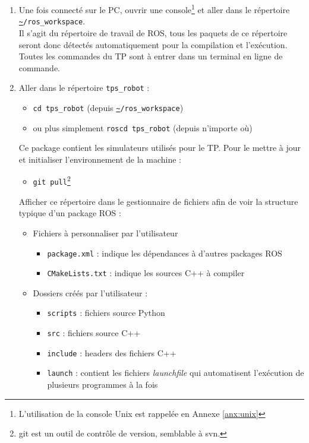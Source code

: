 \documentclass[12pt,a4paper]{article}
\begin{document}
\begin{enumerate}
 \item Une fois connecté sur le PC, ouvrir une console\footnote{ L'utilisation de la console Unix est rappelée en Annexe \ref{anx:unix}} et aller dans le répertoire \texttt{\url{~}/ros\_workspace}.\\
 Il s'agit du répertoire de travail de ROS, tous les paquets de ce répertoire seront donc détectés automatiquement pour la compilation et l'exécution.
Toutes les commandes du TP sont à entrer dans un terminal en ligne de commande.
 \item Aller dans le répertoire \texttt{tps\_robot} : 
 \begin{itemize}
  \item \texttt{cd tps\_robot} (depuis \texttt{\url{~}/ros\_workspace})
  \item ou plus simplement \texttt{roscd tps\_robot} (depuis n'importe où)
 \end{itemize}
 Ce package contient les simulateurs utilisés pour le TP. Pour le mettre à jour et initialiser l'environnement de la machine :
 \begin{itemize}
 \item \texttt{git pull}\footnote{git est un outil de contrôle de version, semblable à svn.}
 \end{itemize}
 Afficher ce répertoire dans le gestionnaire de fichiers afin de voir la structure typique d'un package ROS :
 \begin{itemize}
 \item Fichiers à personnaliser par l'utilisateur
 \begin{itemize}
 \item \texttt{package.xml} : indique les dépendances à d'autres packages ROS
 \item \texttt{CMakeLists.txt} : indique les sources C++ à compiler
 \end{itemize} 
 \item Dossiers créés par l'utilisateur :
 \begin{itemize}
 \item \texttt{scripts} : fichiers source Python
 \item \texttt{src} : fichiers source C++
 \item \texttt{include} : headers des fichiers C++
 \item \texttt{launch} : contient les fichiers \emph{launchfile} qui automatisent l'exécution de plusieurs programmes à la fois

\end{itemize}
\end{itemize}
\end{enumerate}
\end{document}
